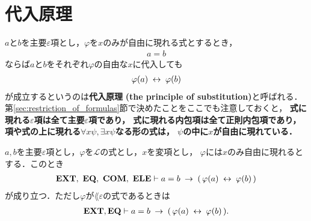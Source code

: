 \section{代入原理}
	$a$と$b$を主要$\varepsilon$項とし，$\varphi$を$x$のみが自由に現れる式とするとき，
	\begin{align}
		a = b
	\end{align}
	ならば$a$と$b$をそれぞれ$\varphi$の自由な$x$に代入しても
	\begin{align}
		\varphi(a) \hspace{0.25em}\leftrightarrow\hspace{0.25em} \varphi(b)
	\end{align}
	が成立するというのは{\bf 代入原理}
	{\bf (the principle of substitution)}と呼ばれる．
	第\ref{sec:restriction_of_formulas}節で決めたことをここでも注意しておくと，
	{\bf 式に現れる$\varepsilon$項は全て主要$\varepsilon$項であり，
	式に現れる内包項は全て正則内包項であり，
	項や式の上に現れる$\forall x \psi,\exists x \psi$なる形の式は，
	$\psi$の中に$x$が自由に現れている．}
	
	
	
	\begin{screen}
		\begin{thm}[代入原理]\label{thm:the_principle_of_substitution}
			$a,b$を主要$\varepsilon$項とし，$\varphi$を$\mathcal{L}$の式とし，$x$を変項とし，
			$\varphi$には$x$のみ自由に現れるとする．このとき
			\begin{align}
				\mbox{{\bf EXT}},\ \mbox{{\bf EQ}},\ \mbox{\bf COM},\ \mbox{{\bf ELE}} \vdash a = b \hspace{0.25em}\rightarrow\hspace{0.25em} 
				(\, \varphi(a) \hspace{0.25em}\leftrightarrow\hspace{0.25em} \varphi(b)\, )
			\end{align}
			が成り立つ．ただし$\varphi$が$\lang{\varepsilon}$の式であるときは
			\begin{align}
				\mbox{{\bf EXT}},\mbox{{\bf EQ}} \vdash a = b \hspace{0.25em}\rightarrow\hspace{0.25em} 
				(\, \varphi(a) \hspace{0.25em}\leftrightarrow\hspace{0.25em} \varphi(b)\, ).
			\end{align}
		\end{thm}
	\end{screen}
	
